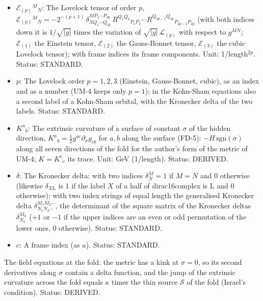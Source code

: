 \documentclass[
  10pt,
]{article}
\begin{document}
\begin{itemize}
  \(\sigma \to \mp\infty\) the tips \(z \to 0, \pi\); one period of
  \(x_0\) is the whole line \(-\infty < \sigma < \infty\). Unit: length.
  Status: DERIVED.
\item
  \(\mathcal{E}_{(p)}{}^M{}_N\): The Lovelock tensor of order \(p\),
  \(\mathcal{E}_{(p)}{}^M{}_N = -2^{-(p+1)}\,\delta^{MP_1\cdots P_{2p}}_{NQ_1\cdots Q_{2p}}\,R^{Q_1Q_2}{}_{P_1P_2}\cdots R^{Q_{2p-1}Q_{2p}}{}_{P_{2p-1}P_{2p}}\)
  (with both indices down it is \(1/\sqrt{\lvert g\rvert}\) times the
  variation of \(\sqrt{\lvert g\rvert}\,\mathcal{L}_{(p)}\) with respect
  to \(g^{MN}\); \(\mathcal{E}_{(1)}\) the Einstein tensor,
  \(\mathcal{E}_{(2)}\) the Gauss-Bonnet tensor, \(\mathcal{E}_{(3)}\)
  the cubic Lovelock tensor); with frame indices its frame components.
  Unit: 1/length\(^{2p}\). Status: STANDARD.
\item
  \(p\): The Lovelock order \(p = 1, 2, 3\) (Einstein, Gauss-Bonnet,
  cubic), as an index and as a number (UM-4 keeps only \(p = 1\)); in
  the Kohn-Sham equations also a second label of a Kohn-Sham orbital,
  with the Kronecker delta of the two labels. Status: STANDARD.
\item
  \(K^a{}_b\): The extrinsic curvature of a surface of constant
  \(\sigma\) of the hidden direction,
  \(K^a{}_b = \frac12 g^{ac}\partial_\sigma g_{cb}\) for \(a, b\) along
  the surface (FD-5): \(-H\,\mathrm{sgn}(\sigma)\) along all seven
  directions of the fold for the author's form of the metric of UM-4;
  \(K = K^c{}_c\) its trace. Unit: GeV (1/length). Status: DERIVED.
\item
  \(\delta\): The Kronecker delta: with two indices \(\delta^M_N = 1\)
  if \(M = N\) and 0 otherwise (likewise \(\delta_{X\mathrm{L}}\) is 1
  if the label \(X\) of a half of dirac16complex is L and 0 otherwise);
  with two index strings of equal length the generalised Kronecker delta
  \(\delta^{M_1M_2\cdots}_{N_1N_2\cdots}\), the determinant of the
  square matrix of the Kronecker deltas \(\delta^{M_a}_{N_b}\) (\(+1\)
  or \(-1\) if the upper indices are an even or odd permutation of the
  lower ones, 0 otherwise). Status: STANDARD.
\item
  \(c\): A frame index (as \(a\)). Status: STANDARD.
\end{itemize}

The field equations at the fold: the metric has a kink at
\(\sigma = 0\), so its second derivatives along \(\sigma\) contain a
delta function, and the jump of the extrinsic curvature across the fold
equals \(\kappa\) times the thin source \(\mathcal{S}\) of the fold
(Israel's condition). Status: DERIVED.
\end{document}
